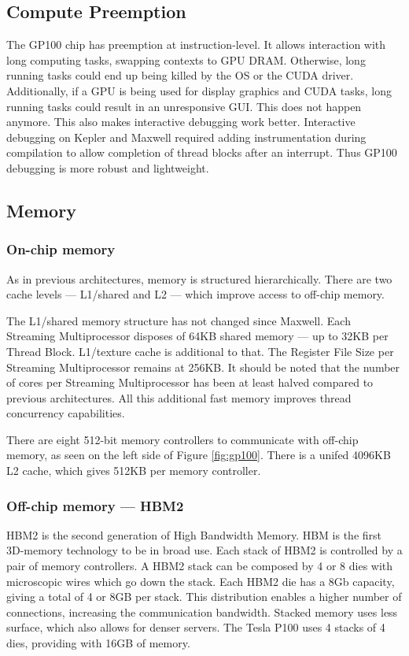 \subsection{Compute Preemption}
The GP100 chip has preemption at instruction-level.
It allows interaction with long computing tasks, swapping contexts to GPU DRAM.
Otherwise, long running tasks could end up being killed by the OS or the CUDA driver.
Additionally, if a GPU is being used for display graphics and CUDA tasks, long running tasks could result in an unresponsive GUI.
This does not happen anymore.
This also makes interactive debugging work better.
Interactive debugging on Kepler and Maxwell required adding instrumentation during compilation to allow completion of thread blocks after an interrupt.
Thus GP100 debugging is more robust and lightweight.

\subsection{Memory}
\subsubsection{On-chip memory}
As in previous architectures, memory is structured hierarchically.
There are two cache levels --- L1/shared and L2 --- which improve access to off-chip memory.

The L1/shared memory structure has not changed since Maxwell.
Each Streaming Multiprocessor disposes of 64KB shared memory --- up to 32KB per Thread Block.
L1/texture cache is additional to that.
The Register File Size per Streaming Multiprocessor remains at 256KB.
It should be noted that the number of cores per Streaming Multiprocessor has been at least halved compared to previous architectures.
All this additional fast memory improves thread concurrency capabilities.

There are eight 512-bit memory controllers to communicate with off-chip memory, as seen on the left side of Figure \ref{fig:gp100}.
There is a unifed 4096KB L2 cache, which gives 512KB per memory controller.

\subsubsection{Off-chip memory --- HBM2}
HBM2 is the second generation of High Bandwidth Memory.
HBM is the first 3D-memory technology to be in broad use.
Each stack of HBM2 is controlled by a pair of memory controllers.
A HBM2 stack can be composed by 4 or 8 dies with microscopic wires which go down the stack.
Each HBM2 die has a 8Gb capacity, giving a total of 4 or 8GB per stack.
This distribution enables a higher number of connections, increasing the communication bandwidth.
Stacked memory uses less surface, which also allows for denser servers.
The Tesla P100 uses 4 stacks of 4 dies, providing with 16GB of memory.

